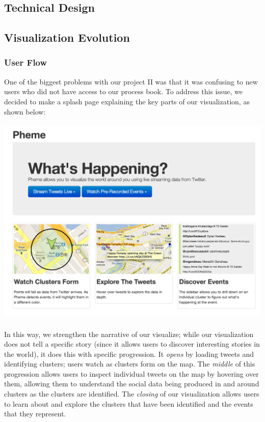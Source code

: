 \documentclass[pdftex,12pt,a4paper]{article}
\begin{document}
\subsection{Technical Design}

\subsection{Visualization Evolution}
\subsubsection{User Flow}
One of the biggest problems with our project II was that it was confusing to new users who did not have access to our process book. To address this issue, we decided to make a splash page explaining the key parts of our visualization, as shown below: \\ \\
\includegraphics[width=5.5in]{splash.png} \\ \\
In this way, we strengthen the narrative of our visualize; while our visualization does not tell a specific story (since it allows users to discover interesting stories in the world), it does this with specific progression. It \emph{opens} by loading tweets and identifying clusters; users watch as clusters form on the map. The \emph{middle} of this progression allows users to inspect individual tweets on the map by hovering over them, allowing them to understand the social data being produced in and around clusters as the clusters are identified. The \emph{closing} of our visualization allows users to learn about and explore the clusters that have been identified and the events that they represent.
\end{document}
